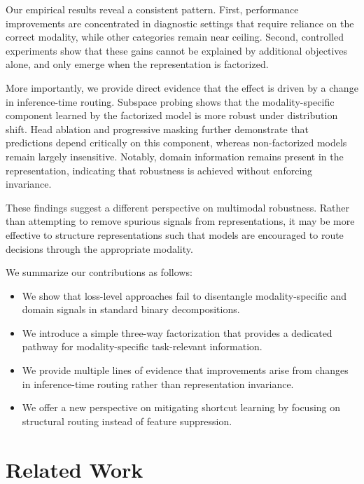 \documentclass{article}
\begin{document}
Our empirical results reveal a consistent pattern. First, performance improvements are concentrated in diagnostic settings that require reliance on the correct modality, while other categories remain near ceiling. Second, controlled experiments show that these gains cannot be explained by additional objectives alone, and only emerge when the representation is factorized.

More importantly, we provide direct evidence that the effect is driven by a change in inference-time routing. Subspace probing shows that the modality-specific component learned by the factorized model is more robust under distribution shift. Head ablation and progressive masking further demonstrate that predictions depend critically on this component, whereas non-factorized models remain largely insensitive. Notably, domain information remains present in the representation, indicating that robustness is achieved without enforcing invariance.

These findings suggest a different perspective on multimodal robustness. Rather than attempting to remove spurious signals from representations, it may be more effective to structure representations such that models are encouraged to route decisions through the appropriate modality.

We summarize our contributions as follows:
\begin{itemize}
\item We show that loss-level approaches fail to disentangle modality-specific and domain signals in standard binary decompositions.
\item We introduce a simple three-way factorization that provides a dedicated pathway for modality-specific task-relevant information.
\item We provide multiple lines of evidence that improvements arise from changes in inference-time routing rather than representation invariance.
\item We offer a new perspective on mitigating shortcut learning by focusing on structural routing instead of feature suppression.
\end{itemize}

\section{Related Work}
\end{document}
